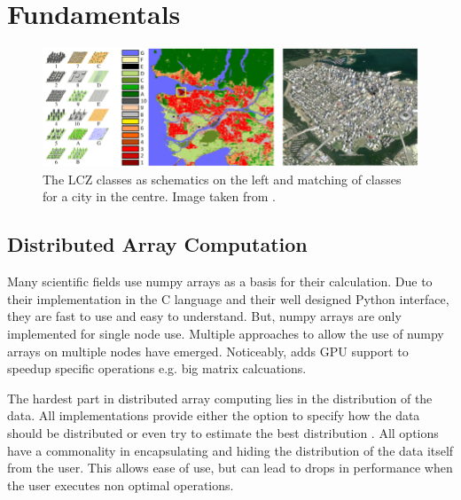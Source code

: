 \section{Fundamentals}
\label{sec:fundamentals}

\begin{figure}[t]
  \centering
  \includegraphics[width=0.9\linewidth]{images/schematic-lcz.png}
  \caption{The LCZ classes as schematics on the left and matching of classes for a city in the centre. Image taken from \cite{zhu_so2sat_2019}.}\label{fig:lcz_classes}
\end{figure}


\subsection{Distributed Array Computation}
\label{subsec:distributed_array_computation}
Many scientific fields use \gls{numpy} arrays as a basis for their calculation. Due to their implementation in the C language and their well designed
Python interface, they are fast to use and easy to understand. But, \gls{numpy} arrays are only implemented for single node use.
Multiple approaches to allow the use of \gls{numpy} arrays on multiple nodes have emerged.
Noticeably, \cite{bauer_legate_2019} adds \gls{GPU} support to speedup specific operations e.g. big matrix calcuations.

The hardest part in distributed array computing lies in the distribution of the data. All implementations provide
either the option to specify how the data should be distributed or even try to estimate the best distribution \cite{huang_spartan_nodate}.
All options have a commonality in encapsulating and hiding the distribution of the data itself from the user.
This allows ease of use, but can lead to drops in performance when the user executes non optimal operations.


